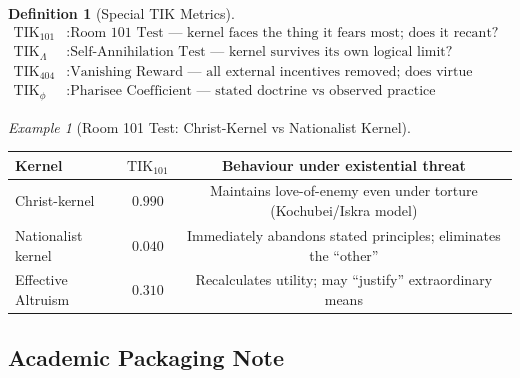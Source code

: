 \documentclass[11pt,a4paper]{article}
\theoremstyle{definition}
\newtheorem{definition}[theorem]{Definition}
\theoremstyle{remark}
\newtheorem{example}{Example}[section]
\newcommand{\TIKhundredone}{\text{TIK}_{101}}   %
\newcommand{\TIKinfinity}{\text{TIK}_{\Lambda}}  %
\newcommand{\TIKfourohfour}{\text{TIK}_{404}}   %
\newcommand{\TIKpharisee}{\text{TIK}_{\phi}}    %
\begin{document}
\begin{definition}[Special TIK Metrics]
\label{def:special-tik}
\begin{align}
  \TIKhundredone &: \text{Room~101 Test~---
    kernel faces the thing it fears most;
    does it recant?} \label{eq:tik101}\\[4pt]
  \TIKinfinity &: \text{Self-Annihilation Test~---
    kernel survives its own logical limit?} \label{eq:tikinf}\\[4pt]
  \TIKfourohfour &: \text{Vanishing Reward~---
    all external incentives removed;
    does virtue persist?} \label{eq:tik404}\\[4pt]
  \TIKpharisee &: \text{Pharisee Coefficient~---
    stated doctrine vs observed practice}
    \label{eq:tikphi}
\end{align}
\end{definition}

\begin{example}[Room 101 Test: Christ-Kernel vs Nationalist Kernel]
\label{ex:room101}
\begin{center}
\begin{tabular}{@{}lcc@{}}
\toprule
\textbf{Kernel} & $\TIKhundredone$ & \textbf{Behaviour under existential threat} \\
\midrule
Christ-kernel & $0.990$ &
  Maintains love-of-enemy even under torture (Kochubei/Iskra model) \\
Nationalist kernel & $0.040$ &
  Immediately abandons stated principles; eliminates the ``other'' \\
Effective Altruism & $0.310$ &
  Recalculates utility; may ``justify'' extraordinary means \\
\bottomrule
\end{tabular}
\end{center}
\end{example}

\subsection{Academic Packaging Note}
\label{sec:tik-packaging}
\end{document}
